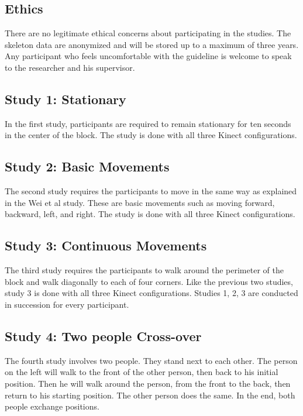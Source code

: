 \documentclass{sigchi}
\begin{document}
\subsection{Ethics}

There are no legitimate ethical concerns about participating in the studies. The skeleton data are anonymized and will be stored up to a maximum of three years. Any participant who feels uncomfortable with the guideline is welcome to speak to the researcher and his supervisor.

\subsection{Study 1: Stationary}

In the first study, participants are required to remain stationary for ten seconds in the center of the block. The study is done with all three Kinect configurations.

\subsection{Study 2: Basic Movements}

The second study requires the participants to move in the same way as explained in the Wei et al study. These are basic movements such as moving forward, backward, left, and right. The study is done with all three Kinect configurations.

\subsection{Study 3: Continuous Movements}

The third study requires the participants to walk around the perimeter of the block and walk diagonally to each of four corners. Like the previous two studies, study 3 is done with all three Kinect configurations. Studies 1, 2, 3 are conducted in succession for every participant.

\subsection{Study 4: Two people Cross-over}

The fourth study involves two people. They stand next to each other. The person on the left will walk to the front of the other person, then back to his initial position. Then he will walk around the person, from the front to the back, then return to his starting position. The other person does the same. In the end, both people exchange positions.
\end{document}
